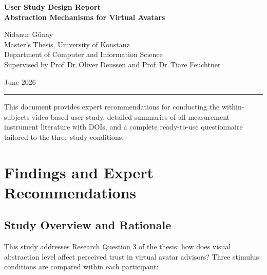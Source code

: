 \documentclass[11pt, a4paper]{article}
\begin{document}
\begin{titlepage}
\centering
\vspace*{2cm}

{\sffamily\LARGE\bfseries\color{konstanzblue}
User Study Design Report\\[8pt]
\large\mdseries Abstraction Mechanisms for Virtual Avatars}

\vspace{1.5cm}
{\large\sffamily Nidanur Günay}\\[4pt]
{\normalsize\sffamily Master's Thesis, University of Konstanz}\\[2pt]
{\normalsize\sffamily Department of Computer and Information Science}\\[2pt]
{\normalsize\sffamily Supervised by Prof.\,Dr.\,Oliver Deussen and Prof.\,Dr.\,Tiare Feuchtner}

\vspace{1cm}
{\normalsize\sffamily June 2026}

\vspace{2cm}
\noindent\rule{0.6\linewidth}{0.8pt}

\vspace{1.2cm}
\begin{minipage}{0.85\textwidth}
\small\sffamily\centering
This document provides expert recommendations for conducting the within-subjects
video-based user study, detailed summaries of all measurement instrument literature
with DOIs, and a complete ready-to-use questionnaire tailored to the three study
conditions.
\end{minipage}

\vfill
\end{titlepage}

\tableofcontents
\newpage

\section{Findings and Expert Recommendations}
\label{sec:recommendations}

\subsection{Study Overview and Rationale}

This study addresses Research Question 3 of the thesis: how does visual abstraction level affect perceived trust in virtual avatar advisors? Three stimulus conditions are compared within each participant:
\end{document}
